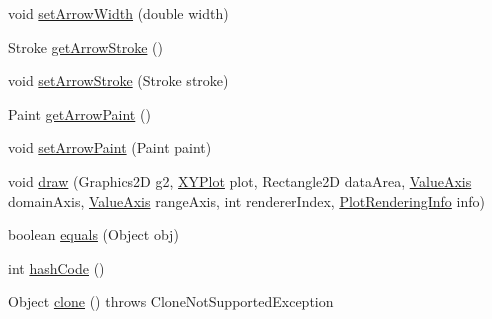 \begin{DoxyCompactItemize}
\item 
void \mbox{\hyperlink{classorg_1_1jfree_1_1chart_1_1annotations_1_1_x_y_pointer_annotation_a1b32ced8b4ccb41c6e7fe98ca225f726}{set\+Arrow\+Width}} (double width)
\item 
Stroke \mbox{\hyperlink{classorg_1_1jfree_1_1chart_1_1annotations_1_1_x_y_pointer_annotation_a1862ff709839409de0275283c50830fa}{get\+Arrow\+Stroke}} ()
\item 
void \mbox{\hyperlink{classorg_1_1jfree_1_1chart_1_1annotations_1_1_x_y_pointer_annotation_a88f681ba5b883b0888bda7c6b229d603}{set\+Arrow\+Stroke}} (Stroke stroke)
\item 
Paint \mbox{\hyperlink{classorg_1_1jfree_1_1chart_1_1annotations_1_1_x_y_pointer_annotation_ac53a34b1e682d8e7dc1df7ec30ee7e46}{get\+Arrow\+Paint}} ()
\item 
void \mbox{\hyperlink{classorg_1_1jfree_1_1chart_1_1annotations_1_1_x_y_pointer_annotation_a7d50d7097cce8e312281b10f20fcf561}{set\+Arrow\+Paint}} (Paint paint)
\item 
void \mbox{\hyperlink{classorg_1_1jfree_1_1chart_1_1annotations_1_1_x_y_pointer_annotation_a2ee7ce42e41d8d7d285232f675477531}{draw}} (Graphics2D g2, \mbox{\hyperlink{classorg_1_1jfree_1_1chart_1_1plot_1_1_x_y_plot}{X\+Y\+Plot}} plot, Rectangle2D data\+Area, \mbox{\hyperlink{classorg_1_1jfree_1_1chart_1_1axis_1_1_value_axis}{Value\+Axis}} domain\+Axis, \mbox{\hyperlink{classorg_1_1jfree_1_1chart_1_1axis_1_1_value_axis}{Value\+Axis}} range\+Axis, int renderer\+Index, \mbox{\hyperlink{classorg_1_1jfree_1_1chart_1_1plot_1_1_plot_rendering_info}{Plot\+Rendering\+Info}} info)
\item 
boolean \mbox{\hyperlink{classorg_1_1jfree_1_1chart_1_1annotations_1_1_x_y_pointer_annotation_ad73ee94ff97f5ce7a9f5339451468869}{equals}} (Object obj)
\item 
int \mbox{\hyperlink{classorg_1_1jfree_1_1chart_1_1annotations_1_1_x_y_pointer_annotation_a0e5736df79fef1467eac6d1dbae6095c}{hash\+Code}} ()
\item 
Object \mbox{\hyperlink{classorg_1_1jfree_1_1chart_1_1annotations_1_1_x_y_pointer_annotation_a25010424cce50bef369bc4a2d76ed907}{clone}} ()  throws Clone\+Not\+Supported\+Exception 
\end{DoxyCompactItemize}
